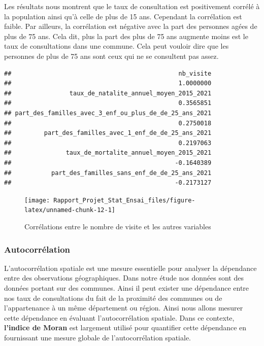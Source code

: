 \documentclass[
]{article}
\begin{document}
Les résultats nous montrent que le taux de consultation est positivement
corrélé à la population ainsi qu'à celle de plus de 15 ans. Cependant la
corrélation est faible. Par ailleurs, la corrélation est négative avec
la part des personnes agées de plus de 75 ans. Cela dit, plus la part
des plus de 75 ans augmente moins est le taux de consultations dans une
commune. Cela peut vouloir dire que les personnes de plus de 75 ans sont
ceux qui ne se consultent pas assez.

\begin{verbatim}
##                                              nb_visite 
##                                              1.0000000 
##                taux_de_natalite_annuel_moyen_2015_2021 
##                                              0.3565851 
## part_des_familles_avec_3_enf_ou_plus_de_de_25_ans_2021 
##                                              0.2750018 
##         part_des_familles_avec_1_enf_de_de_25_ans_2021 
##                                              0.2197063 
##               taux_de_mortalite_annuel_moyen_2015_2021 
##                                             -0.1640389 
##           part_des_familles_sans_enf_de_de_25_ans_2021 
##                                             -0.2173127
\end{verbatim}

\begin{figure}

{\centering \texttt{[image: Rapport\_Projet\_Stat\_Ensai\_files/figure-latex/unnamed-chunk-12-1]} 

}

\caption{Corrélations entre le nombre de visite et les autres variables}\label{fig:unnamed-chunk-12}
\end{figure}

\subsubsection{Autocorrélation}\label{autocorruxe9lation}

L'autocorrélation spatiale est une mesure essentielle pour analyser la
dépendance entre des observations géographiques. Dans notre étude nos
données sont des données portant sur des communes. Ainsi il peut exister
une dépendance entre nos taux de consultations du fait de la proximité
des communes ou de l'appartenance à un même département ou région. Ainsi
nous allons mesurer cette dépendance en évaluant l'autocorrélation
spatiale. Dans ce contexte, \textbf{l'indice de Moran} est largement
utilisé pour quantifier cette dépendance en fournissant une mesure
globale de l'autocorrélation spatiale.
\end{document}
